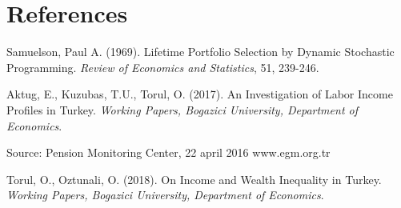 \chapter*{References}

\begin{description}

\item Samuelson, Paul A. (1969). Lifetime Portfolio Selection by Dynamic Stochastic Programming. \textit{Review of Economics and Statistics}, 51, 239-246.
 
\item Aktug, E., Kuzubas, T.U., Torul, O. (2017). An Investigation of Labor Income Profiles in Turkey. \textit{Working Papers, Bogazici University, Department of Economics}.

\item Source: Pension Monitoring Center, 22 april 2016 www.egm.org.tr

\item Torul, O., Oztunali, O. (2018). On Income and Wealth Inequality in Turkey. \textit{Working Papers, Bogazici University, Department of Economics}.

\end{description}
